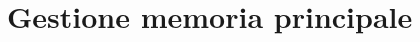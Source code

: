 \documentclass[a4paper]{article}
\begin{document}


\section{Gestione memoria principale}
\end{document}
